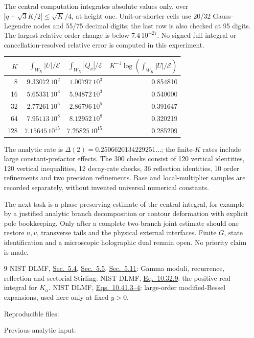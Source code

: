 \documentclass[11pt,a4paper]{article}
\newcommand{\E}{\mathcal E}
\begin{document}
The central computation integrates absolute values only, over
\(|q+\sqrt3K/2|\le\sqrt K/4\), at height one.
Unit-or-shorter cells use 20/32 Gauss--Legendre nodes and 55/75
decimal digits; the last row is also checked at 95 digits.
The largest relative order change is below \(7.4\,10^{-27}\).
No signed full integral or cancellation-resolved relative error
is computed in this experiment.

\begin{center}
\begin{tabular}{rrrr}
\toprule
\(K\)&\(\int_{W_K}|U|/\E\)&\(\int_{W_K}|Q_\nu|/\E\)&
\(K^{-1}\log(\int_{W_K}|U|/\E)\)\\
\midrule
8&\(9.33072\,10^2\)&\(1.00797\,10^3\)&0.854810\\
16&\(5.65331\,10^3\)&\(5.94872\,10^3\)&0.540000\\
32&\(2.77261\,10^5\)&\(2.86796\,10^5\)&0.391647\\
64&\(7.95113\,10^8\)&\(8.12952\,10^8\)&0.320219\\
128&\(7.15645\,10^{15}\)&\(7.25825\,10^{15}\)&0.285209\\
\bottomrule
\end{tabular}
\end{center}
The analytic rate is \(\Delta(2)=0.2506620134229251\ldots\);
the finite-\(K\) rates include large constant-prefactor effects.
The 300 checks consist of 120 vertical identities, 120 vertical
inequalities, 12 decay-rate checks, 36 reflection identities,
10 order refinements and two precision refinements.
Base and local-multiplier samples are recorded separately,
without invented universal numerical constants.

The next task is a phase-preserving estimate of the central
integral, for example by a justified analytic branch decomposition
or contour deformation with explicit pole bookkeeping.
Only after a complete two-branch joint estimate should one restore
\(u,v\), transverse tails and the physical external interfaces.
Finite \(G\), state identification and a microscopic holographic
dual remain open. No priority claim is made.

\begin{thebibliography}{9}
 NIST DLMF,
\href{https://dlmf.nist.gov/5.4}{Sec.\ 5.4},
\href{https://dlmf.nist.gov/5.5}{Sec.\ 5.5},
\href{https://dlmf.nist.gov/5.11}{Sec.\ 5.11}:
Gamma moduli, recurrence, reflection and sectorial Stirling.
 NIST DLMF,
\href{https://dlmf.nist.gov/10.32.E9}{Eq.\ 10.32.9}:
the positive real integral for \(K_\alpha\).
 NIST DLMF,
\href{https://dlmf.nist.gov/10.41}{Eqs.\ 10.41.3--4}:
large-order modified-Bessel expansions, used here only at fixed \(y>0\).
\end{thebibliography}
{\small\noindent Reproducible files:\par
\noindent{}\par
\noindent{}\par
\noindent Previous analytic input:\par
\noindent{}\par}
\end{document}
